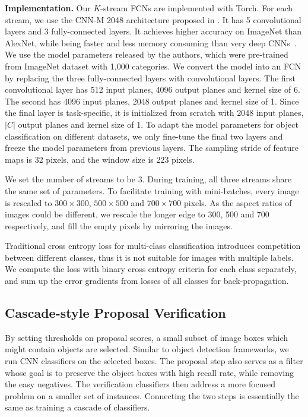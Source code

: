 \documentclass[10pt,twocolumn,letterpaper]{article}
\begin{document}
\textbf{Implementation.} Our $K$-stream FCNs are implemented with Torch. For each stream, we use the CNN-M 2048 architecture proposed in \cite{DBLP:journals/corr/ChatfieldSVZ14}. It has 5 convolutional layers and 3 fully-connected layers. It achieves higher accuracy on ImageNet than AlexNet, while being faster and less memory consuming than very deep CNNs~\cite{Simonyan14c}. We use the model parameters released by the authors, which were pre-trained from ImageNet dataset with 1,000 categories. We convert the model into an FCN by replacing the three fully-connected layers with convolutional layers. The first convolutional layer has 512 input planes, 4096 output planes and kernel size of 6. The second has 4096 input planes, 2048 output planes and kernel size of 1. Since the final layer is task-specific, it is initialized from scratch with 2048 input planes, $|C|$ output planes and kernel size of 1. To adapt the model parameters for object classification on different datasets, we only fine-tune the final two layers and freeze the model parameters from previous layers. The sampling stride of feature maps is 32 pixels, and the  window size is 223 pixels.

We set the number of streams to be 3. During training, all three streams share the same set of parameters. To facilitate training with mini-batches, every image is rescaled to $300\times 300$, $500\times 500$ and $700\times 700$ pixels. As the aspect ratios of images could be different, we rescale the longer edge to 300, 500 and 700 respectively, and fill the empty pixels by mirroring the images. 

Traditional cross entropy loss for multi-class classification introduces competition between different classes, thus it is not suitable for images with multiple labels. We compute the loss with binary cross entropy criteria for each class separately, and sum up the error gradients from losses of all classes for back-propagation. %

\subsection{Cascade-style Proposal Verification}
By setting thresholds on proposal scores, a small subset of image boxes which might contain objects are selected. Similar to object detection frameworks, we run CNN classifiers on the selected boxes. The proposal step also serves as a filter whose goal is to preserve the object boxes with high recall rate, while removing the easy negatives. The verification classifiers then address a more focused problem on a smaller set of instances. Connecting the two steps is essentially the same as training a cascade of classifiers.
\end{document}
